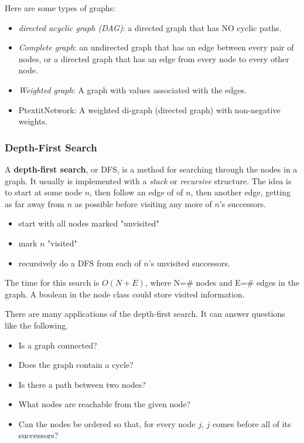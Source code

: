 Here are some types of graphs:
\begin{itemize}
	\item \textit{directed acyclic graph (DAG)}: a directed graph that has NO cyclic paths. 
	\item \textit{Complete graph}: an undirected graph that has an edge between every pair of nodes, or a directed graph that has an edge from every node to every other node. 
	\item \textit{Weighted graph}: A graph with values associated with the edges. 
	\item Ptextit{Network}: A weighted di-graph (directed graph) with non-negative weights. 
\end{itemize}

\subsubsection{Depth-First Search}

A \textbf{depth-first search}, or DFS, is a method for searching through the nodes in a graph. It usually is implemented with a \textit{stack} or \textit{recursive} structure. The idea is to start at some node $n$, then follow an edge of of $n$, then another edge, getting as far away from $n$ as possible before visiting any more of $n$'s successors. 
\begin{itemize}
	\item start with all nodes marked "unvisited"
	\item mark $n$ "visited"
	\item recursively do a DFS from each of $n$'s unvisited successors. 
\end{itemize}

The time for this search is $O(N+E)$, where N=\# nodes and E=\# edges in the graph. A boolean in the node class could store visited information.

There are many applications of the depth-first search. It can answer questions like the following.
\begin{itemize}
	\item Is a graph connected?
	\item Does the graph contain a cycle?
	\item Is there a path between two nodes?
	\item What nodes are reachable from the given node?
	\item Can the nodes be ordered so that, for every node $j$, $j$ comes before all of its successors?
\end{itemize}

